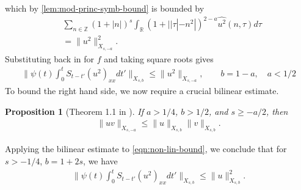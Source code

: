 \documentclass[12pt,reqno]{amsart}
\numberwithin{equation}{section}  %
\numberwithin{figure}{section}
\newcommand{\rr}{\mathbb{R}}
\newcommand{\zz}{\mathbb{Z}}
\newcommand{\wh}{\widehat}
\theoremstyle{plain}
\newtheorem{proposition}{Proposition}
\theoremstyle{definition}
\theoremstyle{remark}
\begin{document}
%
%
which by \autoref{lem:mod-princ-symb-bound} is bounded by 
%
%
%
\begin{equation*}
\begin{split}
  & 
  \sum_{n \in \zz} (1 + |n|)^{s} \int_{\rr} (1 + | |\tau|
  - n^{2} |)^{2-a} \wh{u^{2}}(n, \tau) d \tau  
  \\
  & = \|u^{2} \|_{X_{s,-a}}^{2}.
\end{split}
\end{equation*}
%
%
Substituting back in for $f$ and taking square roots gives
%
%
\begin{equation}
\begin{split}
  \|\psi(t) \int_{0}^{t} S_{t-t'} (u^{2})_{xx} dt'\|_{X_{s,b}} \le \| u^{2}
  \|_{X_{s,-a}}, \qquad b = 1-a, \quad a < 1/2
\end{split}
\label{eqn:non-lin-bound}
\end{equation}
%
%
To bound the right hand side, we now require a crucial bilinear
estimate.
%
%
%
%
%
%
%
%
\begin{proposition}[Theorem 1.1 in \cite{Farah:2009uq}]
\label{prop:bilin-est}
  If $a > 1/4$, $b > 1/2$, and $s \ge -a/2$, 
  then 
  \begin{equation*}
  \begin{split}
    \| uv \|_{X_{s,-a}} \le  \| u \|_{X_{s,b}} \| v \|_{X_{s,b}}.
  \end{split}
  \end{equation*}
\end{proposition}
%
%
Applying the bilinear estimate to \eqref{eqn:non-lin-bound}, we conclude that
for $s > -1/4$, $b = 1 + 2s$, we have 
%
%
\begin{equation}
\begin{split}
\|\psi(t) \int_{0}^{t} S_{t-t'} (u^{2})_{xx} dt'\|_{X_{s,b}} \le 
  \| u \|^2_{X_{s,b}}. 
\end{split}
\label{eqn:nonlinear-term-bound}
\end{equation}
%
%
%
%
%
%
\end{document}
